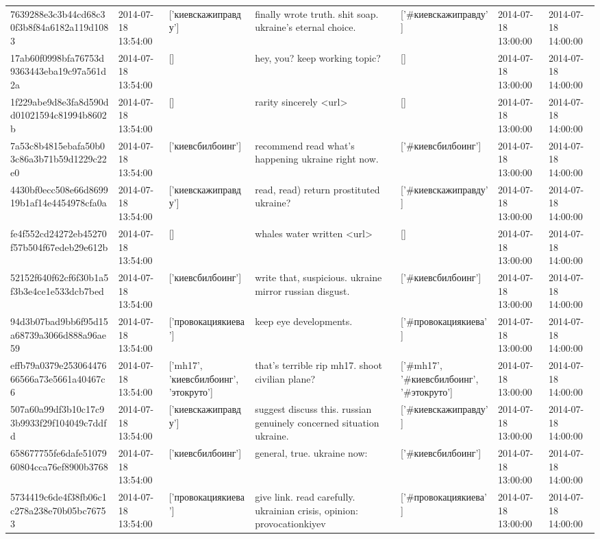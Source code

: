 \begin{tabular}{lllllll}
7639288e3c3b44cd68c30f3b8f84a6182a119d1083 & 2014-07-18 13:54:00 & ['киевскажиправду'] & finally wrote truth. shit soap. ukraine's eternal choice. & ['#киевскажиправду'] & 2014-07-18 13:00:00 & 2014-07-18 14:00:00 \\
17ab60f0998bfa76753d9363443eba19c97a561d2a & 2014-07-18 13:54:00 & [] & hey, you? keep working topic? & [] & 2014-07-18 13:00:00 & 2014-07-18 14:00:00 \\
1f229abe9d8e3fa8d590dd01021594c81994b8602b & 2014-07-18 13:54:00 & [] & rarity sincerely <url> & [] & 2014-07-18 13:00:00 & 2014-07-18 14:00:00 \\
7a53c8b4815ebafa50b03c86a3b71b59d1229c22e0 & 2014-07-18 13:54:00 & ['киевсбилбоинг'] & recommend read what's happening ukraine right now. & ['#киевсбилбоинг'] & 2014-07-18 13:00:00 & 2014-07-18 14:00:00 \\
4430bf0ecc508e66d869919b1af14e4454978cfa0a & 2014-07-18 13:54:00 & ['киевскажиправду'] & read, read) return prostituted ukraine? & ['#киевскажиправду'] & 2014-07-18 13:00:00 & 2014-07-18 14:00:00 \\
fe4f552cd24272eb45270f57b504f67edeb29e612b & 2014-07-18 13:54:00 & [] & whales water written <url> & [] & 2014-07-18 13:00:00 & 2014-07-18 14:00:00 \\
52152f640f62cf6f30b1a5f3b3e4ce1e533dcb7bed & 2014-07-18 13:54:00 & ['киевсбилбоинг'] & write that, suspicious. ukraine mirror russian disgust. & ['#киевсбилбоинг'] & 2014-07-18 13:00:00 & 2014-07-18 14:00:00 \\
94d3b07bad9bb6f95d15a68739a3066d888a96ae59 & 2014-07-18 13:54:00 & ['провокациякиева'] & keep eye developments. & ['#провокациякиева'] & 2014-07-18 13:00:00 & 2014-07-18 14:00:00 \\
effb79a0379e25306447666566a73e5661a40467c6 & 2014-07-18 13:54:00 & ['mh17', 'киевсбилбоинг', 'этокруто'] & that's terrible rip mh17. shoot civilian plane? & ['#mh17', '#киевсбилбоинг', '#этокруто'] & 2014-07-18 13:00:00 & 2014-07-18 14:00:00 \\
507a60a99df3b10c17c93b9933f29f104049c7ddfd & 2014-07-18 13:54:00 & ['киевскажиправду'] & suggest discuss this. russian genuinely concerned situation ukraine. & ['#киевскажиправду'] & 2014-07-18 13:00:00 & 2014-07-18 14:00:00 \\
658677755fe6dafe5107960804cca76ef8900b3768 & 2014-07-18 13:54:00 & ['киевсбилбоинг'] & general, true. ukraine now: & ['#киевсбилбоинг'] & 2014-07-18 13:00:00 & 2014-07-18 14:00:00 \\
5734419c6de4f38fb06c1c278a238e70b05bc76753 & 2014-07-18 13:54:00 & ['провокациякиева'] & give link. read carefully. ukrainian crisis, opinion: provocationkiyev & ['#провокациякиева'] & 2014-07-18 13:00:00 & 2014-07-18 14:00:00 \\

\end{tabular}

